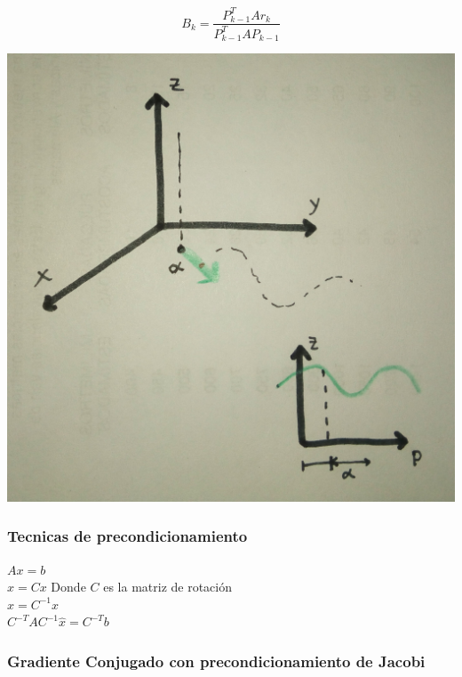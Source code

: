 \begin{displaymath}
B_k=\frac{P_{k-1}^TAr_k}{P_{k-1}^TAP_{k-1}}
\end{displaymath}
\begin{center}
\includegraphics[scale=.05]{imagenes/7.jpg}
\end{center}

\subsubsection*{Tecnicas de precondicionamiento}

$Ax=b$\\
$\hat{x}=Cx$ Donde $C$ es la matriz de rotaci\'on \\
$x=C^{-1}\hat{x}$\\
$C^{-T}AC^{-1}\hat{x}=C^{-T}b$

\subsubsection{Gradiente Conjugado con precondicionamiento de Jacobi}
